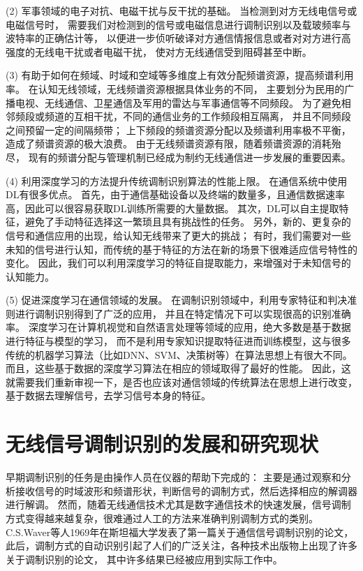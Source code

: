 (2) 军事领域的电子对抗、电磁干扰与反干扰的基础。
当检测到对方无线电信号或电磁信号时，
需要我们对检测到的信号或电磁信息进行调制识别以及载玻频率与波特率的正确估计等，
以便进一步侦听破译对方通信情报信息或者对对方进行高强度的无线电干扰或者电磁干扰，
使对方无线通信受到阻碍甚至中断。\par

(3) 有助于如何在频域、时域和空域等多维度上有效分配频谱资源，提高频谱利用率。
在认知无线领域，无线频谱资源根据具体业务的不同，
主要划分为民用的广播电视、无线通信、卫星通信及军用的雷达与军事通信等不同频段。
为了避免相邻频段或频道的互相干扰，不同的通信业务的工作频段相互隔离，
并且不同频段之间预留一定的间隔频带；
上下频段的频谱资源分配以及频谱利用率极不平衡，造成了频谱资源的极大浪费。
由于无线频谱资源有限，随着频谱资源的消耗殆尽，
现有的频谱分配与管理机制已经成为制约无线通信进一步发展的重要因素。\par

(4) 利用深度学习的方法提升传统调制识别算法的性能上限。
在通信系统中使用DL有很多优点。 首先，由于通信基础设备以及终端的数量多，且通信数据速率高，因此可以很容易获取DL训练所需要的大量数据。
其次，DL可以自主提取特征，避免了手动特征选择这一繁琐且具有挑战性的任务。
另外，新的、更复杂的信号和通信应用的出现，给认知无线带来了更大的挑战；
有时，我们需要对一些未知的信号进行认知，而传统的基于特征的方法在新的场景下很难适应信号特性的变化。
因此，我们可以利用深度学习的特征自提取能力，来增强对于未知信号的认知能力。\par

(5) 促进深度学习在通信领域的发展。
在调制识别领域中，利用专家特征和判决准则进行调制识别得到了广泛的应用，
并且在特定情况下可以实现很高的识别准确率。
深度学习在计算机视觉和自然语言处理等领域的应用，绝大多数是基于数据进行特征与模型的学习，
而不是利用专家知识提取特征进而训练模型，这与很多传统的机器学习算法（比如DNN、SVM、决策树等）在算法思想上有很大不同。
而且，这些基于数据的深度学习算法在相应的领域取得了最好的性能。
因此，这就需要我们重新审视一下，是否也应该对通信领域的传统算法在思想上进行改变，
基于数据去理解信号，去学习信号本身的特征。\par

\section{无线信号调制识别的发展和研究现状}

早期调制识别的任务是由操作人员在仪器的帮助下完成的：
主要是通过观察和分析接收信号的时域波形和频谱形状，判断信号的调制方式，然后选择相应的解调器进行解调。
然而，随着无线通信技术尤其是数字通信技术的快速发展，信号调制方式变得越来越复杂，很难通过人工的方法来准确判别调制方式的类别。 
C.S.Waver等人1969年在斯坦福大学发表了第一篇关于通信信号调制识别的论文\cite{weaver1969automatic}，
此后，调制方式的自动识别引起了人们的广泛关注，各种技术出版物上出现了许多关于调制识别的论文，
其中许多结果已经被应用到实际工作中。 \par

